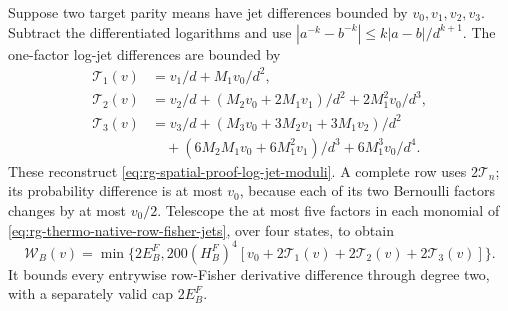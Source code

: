 Suppose two target parity means have jet differences bounded by
\(v_0,v_1,v_2,v_3\). Subtract the differentiated logarithms and use
\(|a^{-k}-b^{-k}|\le k|a-b|/d^{k+1}\). The one-factor log-jet differences
are bounded by
\begin{equation}
 \begin{split}
 \mathcal T_1(v)&=v_1/d+M_1v_0/d^2,\\
 \mathcal T_2(v)&=v_2/d+(M_2v_0+2M_1v_1)/d^2+2M_1^2v_0/d^3,\\
 \mathcal T_3(v)&=v_3/d+(M_3v_0+3M_2v_1+3M_1v_2)/d^2\\
 &\quad +(6M_2M_1v_0+6M_1^2v_1)/d^3+6M_1^3v_0/d^4.
 \end{split}
 \label{eq:rg-thermo-native-log-moduli}
\end{equation}
These reconstruct \cref{eq:rg-spatial-proof-log-jet-moduli}. A complete
row uses \(2\mathcal T_n\); its probability difference is at most
\(v_0\), because each of its two Bernoulli factors changes by at most
\(v_0/2\). Telescope the at most five factors in each monomial of
\cref{eq:rg-thermo-native-row-fisher-jets}, over four states, to obtain
\begin{equation}
 \mathcal W_B(v)=\min\{2E_B^F,
 200(H_B^F)^4[v_0+2\mathcal T_1(v)+2\mathcal T_2(v)+2\mathcal T_3(v)]\}.
 \label{eq:rg-thermo-native-row-modulus-map}
\end{equation}
It bounds every entrywise row-Fisher derivative difference through degree
two, with a separately valid cap \(2E_B^F\).


